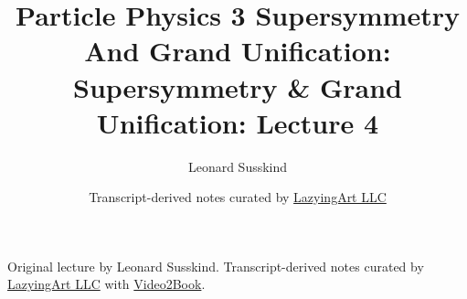 \documentclass[11pt,oneside]{book}
\begin{document}
\frontmatter
\title{Particle Physics 3 Supersymmetry And Grand Unification: Supersymmetry \& Grand Unification: Lecture 4}
\author{Leonard Susskind}
\date{Transcript-derived notes curated by \href{https://lazying.art}{LazyingArt LLC}}
\maketitle
\begin{center}
\small Original lecture by Leonard Susskind. Transcript-derived notes curated by \href{https://lazying.art}{LazyingArt LLC} with \href{https://github.com/lachlanchen/Video2Book}{Video2Book}.
\end{center}
\clearpage
\mainmatter

\end{document}
